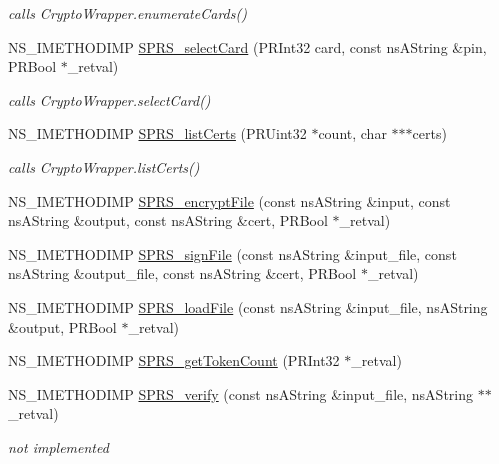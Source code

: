 \begin{DoxyCompactItemize}
\begin{DoxyCompactList}\small\item\em calls CryptoWrapper.enumerateCards() \item\end{DoxyCompactList}\item 
NS\_\-IMETHODIMP \hyperlink{classnsSPRS__PKCS11__Wrapper_af5ef8c8041adef789e6e6d3d38237a2b}{SPRS\_\-selectCard} (PRInt32 card, const nsAString \&pin, PRBool $\ast$\_\-retval)
\begin{DoxyCompactList}\small\item\em calls CryptoWrapper.selectCard() \item\end{DoxyCompactList}\item 
NS\_\-IMETHODIMP \hyperlink{classnsSPRS__PKCS11__Wrapper_a41711bc3e37111e22ef0bf7eaacdbc13}{SPRS\_\-listCerts} (PRUint32 $\ast$count, char $\ast$$\ast$$\ast$certs)
\begin{DoxyCompactList}\small\item\em calls CryptoWrapper.listCerts() \item\end{DoxyCompactList}\item 
NS\_\-IMETHODIMP \hyperlink{classnsSPRS__PKCS11__Wrapper_a77930438f26ec1bafd8ab07e8346af26}{SPRS\_\-encryptFile} (const nsAString \&input, const nsAString \&output, const nsAString \&cert, PRBool $\ast$\_\-retval)
\item 
NS\_\-IMETHODIMP \hyperlink{classnsSPRS__PKCS11__Wrapper_a31b12e2b457256fe858eff70590e6c83}{SPRS\_\-signFile} (const nsAString \&input\_\-file, const nsAString \&output\_\-file, const nsAString \&cert, PRBool $\ast$\_\-retval)
\item 
NS\_\-IMETHODIMP \hyperlink{classnsSPRS__PKCS11__Wrapper_a9c7932c785ee05f74583e994405183ca}{SPRS\_\-loadFile} (const nsAString \&input\_\-file, nsAString \&output, PRBool $\ast$\_\-retval)
\item 
NS\_\-IMETHODIMP \hyperlink{classnsSPRS__PKCS11__Wrapper_a91869f39a842b967711d242ce95f9637}{SPRS\_\-getTokenCount} (PRInt32 $\ast$\_\-retval)
\item 
NS\_\-IMETHODIMP \hyperlink{classnsSPRS__PKCS11__Wrapper_a592ec3f3125c461a48a66c4c88c9b118}{SPRS\_\-verify} (const nsAString \&input\_\-file, nsAString $\ast$$\ast$\_\-retval)
\begin{DoxyCompactList}\small\item\em not implemented \item\end{DoxyCompactList}\item 
$$
\end{DoxyCompactItemize}
